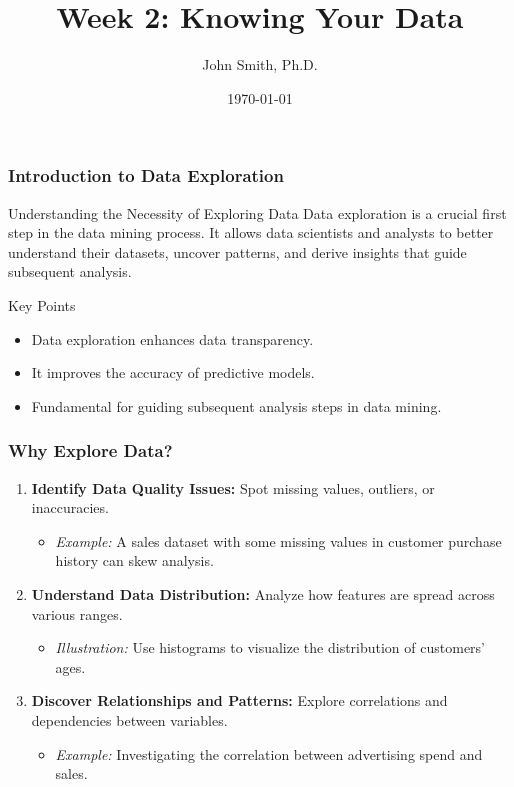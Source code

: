 \documentclass[aspectratio=169]{beamer}
\title[Week 2: Knowing Your Data]{Week 2: Knowing Your Data}
\author[J. Smith]{John Smith, Ph.D.}
\institute[University Name]{
  Department of Computer Science\\
  University Name\\
  \vspace{0.3cm}
  Email: email@university.edu\\
  Website: www.university.edu
}
\date{\today}
\begin{document}
\frame{\titlepage}

\begin{frame}[fragile]
    \frametitle{Introduction to Data Exploration}
    \begin{block}{Understanding the Necessity of Exploring Data}
        Data exploration is a crucial first step in the data mining process. It allows data scientists and analysts to better understand their datasets, uncover patterns, and derive insights that guide subsequent analysis.
    \end{block}
    \begin{block}{Key Points}
        \begin{itemize}
            \item Data exploration enhances data transparency.
            \item It improves the accuracy of predictive models.
            \item Fundamental for guiding subsequent analysis steps in data mining.
        \end{itemize}
    \end{block}
\end{frame}

\begin{frame}[fragile]
    \frametitle{Why Explore Data?}
    \begin{enumerate}
        \item \textbf{Identify Data Quality Issues:} Spot missing values, outliers, or inaccuracies.
            \begin{itemize}
                \item \textit{Example:} A sales dataset with some missing values in customer purchase history can skew analysis.
            \end{itemize}
        \item \textbf{Understand Data Distribution:} Analyze how features are spread across various ranges.
            \begin{itemize}
                \item \textit{Illustration:} Use histograms to visualize the distribution of customers' ages.
            \end{itemize}
        \item \textbf{Discover Relationships and Patterns:} Explore correlations and dependencies between variables.
            \begin{itemize}
                \item \textit{Example:} Investigating the correlation between advertising spend and sales.
            \end{itemize}
    \end{enumerate}
\end{frame}
\end{document}
